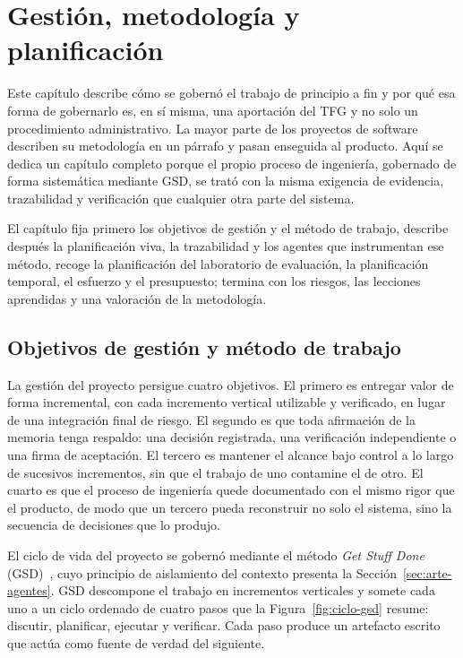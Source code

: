 \chapter{Gestión, metodología y planificación}\label{cap:gestion}\label{cap:metodologia}

Este capítulo describe cómo se gobernó el trabajo de principio a fin y por qué esa forma de
gobernarlo es, en sí misma, una aportación del TFG y no solo un procedimiento administrativo.
La mayor parte de los proyectos de software describen su metodología en un párrafo y pasan
enseguida al producto. Aquí se dedica un capítulo completo porque el propio proceso de
ingeniería, gobernado de forma sistemática mediante GSD, se trató con
la misma exigencia de evidencia, trazabilidad y verificación que cualquier otra parte del
sistema.

El capítulo fija primero los objetivos de gestión y el método de trabajo, describe después la
planificación viva, la trazabilidad y los agentes que instrumentan ese método, recoge la
planificación del laboratorio de evaluación, la planificación temporal, el esfuerzo y el
presupuesto; termina con los riesgos, las lecciones aprendidas y una valoración de la
metodología.

\section{Objetivos de gestión y método de trabajo}\label{sec:met-objetivos-gestion}\label{sec:gestion-problema}\label{sec:met-fases}

La gestión del proyecto persigue cuatro objetivos. El primero es entregar valor de forma
incremental, con cada incremento vertical utilizable y verificado, en lugar de una
integración final de riesgo. El segundo es que toda afirmación de la memoria tenga respaldo:
una decisión registrada, una verificación independiente o una firma de aceptación. El tercero es
mantener el alcance bajo control a lo largo de sucesivos incrementos, sin que el trabajo de
uno contamine el de otro. El cuarto es que el proceso de ingeniería quede documentado con el
mismo rigor que el producto, de modo que un tercero pueda reconstruir no solo el sistema,
sino la secuencia de decisiones que lo produjo.

El ciclo de vida del proyecto se gobernó mediante el método \textit{Get Stuff Done}
(GSD)~\cite{gsd}, cuyo principio de aislamiento del contexto presenta la
Sección~\ref{sec:arte-agentes}. GSD descompone el trabajo en incrementos verticales y somete
cada uno a un ciclo ordenado de cuatro pasos que la Figura~\ref{fig:ciclo-gsd} resume: discutir,
planificar, ejecutar y verificar. Cada paso produce un artefacto escrito que actúa como
fuente de verdad del siguiente.

